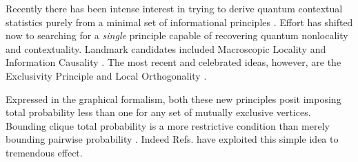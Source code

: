 \documentclass[
  12pt          %
  ,letterpaper  %
  ,center       %
  ,noupper      %
  ,english,fleqn]{uconnthesis}
\newcommand{\LeftEqns}[1]{\begin{fleqn}[\leftmargini minus \leftmargini]\begin{align}#1\end{align}\end{fleqn}}
\begin{document}

Recently there has been intense interest in trying to derive quantum contextual statistics purely from a minimal set of informational principles \cite{MultiPrinciples2001,MultiPrinciples2011Masanes,MultiPrinciples2011Chiribella,MultiPrinciples2012}. Effort has shifted now to searching for a \emph{single} principle capable of recovering quantum nonlocality and contextuality. Landmark candidates included Macroscopic Locality and Information Causality \cite{MacroscopicLocalityOriginal,ScaraniML,ICOriginal,ICRecovery,ICFailure,InfoCausArXiv,ICGrayWyner}. The most recent and celebrated ideas, however, are the Exclusivity Principle \cite{EPOriginal,EPSpecker,EPExampleGraphs,EPHenson,EPYan,EP2013,EPTwoCities,EPTsirelson} and Local Orthogonality \cite{LONatureComm,FritzCombinatorialLong,LONewShort,LOHardy,LOExploring}.

Expressed in the graphical formalism, both these new principles posit imposing total probability less than one for any set of mutually exclusive vertices. Bounding \gls{clique} total probability is a more restrictive condition than merely bounding pairwise probability \cite{SpekkensSeer}. Indeed Refs. \cite{EPOriginal,LONatureComm,FritzCombinatorialLong,LONewShort,LOHardy,LOExploring,CSWNew,EP2013,EPTsirelson} have exploited this simple idea to tremendous effect.
\end{document}
